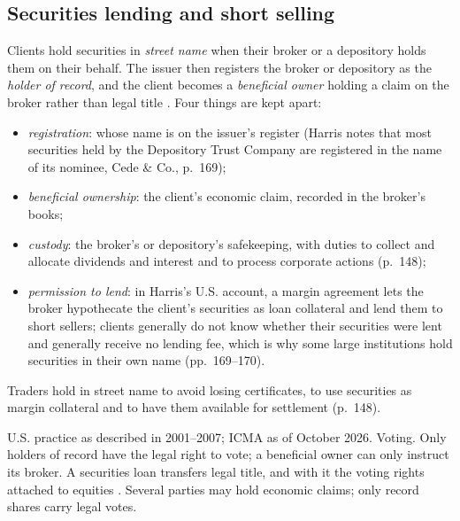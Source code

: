 \subsection{Securities lending and short selling}

\begin{qfdefinition}\label{def:street-name-beneficial-ownership}
 Clients hold securities in \emph{street name} when their broker or a depository holds them on their behalf. The issuer then registers the broker or depository as the \emph{holder of record}, and the client becomes a \emph{beneficial owner} holding a claim on the broker rather than legal title \citep[chap.~``Brokers'', secs.~7.2.2.2 and~7.5.6.1, pp.~148 and~169--170]{alpha-harris}. Four things are kept apart:
\begin{itemize}
\item \emph{registration}: whose name is on the issuer's register (Harris notes that most securities held by the Depository Trust Company are registered in the name of its nominee, Cede \& Co., p.~169);
\item \emph{beneficial ownership}: the client's economic claim, recorded in the broker's books;
\item \emph{custody}: the broker's or depository's safekeeping, with duties to collect and allocate dividends and interest and to process corporate actions (p.~148);
\item \emph{permission to lend}: in Harris's U.S. account, a margin agreement lets the broker hypothecate the client's securities as loan collateral and lend them to short sellers; clients generally do not know whether their securities were lent and generally receive no lending fee, which is why some large institutions hold securities in their own name (pp.~169--170).
\end{itemize}
Traders hold in street name to avoid losing certificates, to use securities as margin collateral and to have them available for settlement (p.~148).

 U.S. practice as described in 2001--2007; ICMA as of October 2026. Voting. Only holders of record have the legal right to vote; a beneficial owner can only instruct its broker. A securities loan transfers legal title, and with it the voting rights attached to equities \citep[Repo FAQ 13]{al-icma}. Several parties may hold economic claims; only record shares carry legal votes.


\end{qfdefinition}
